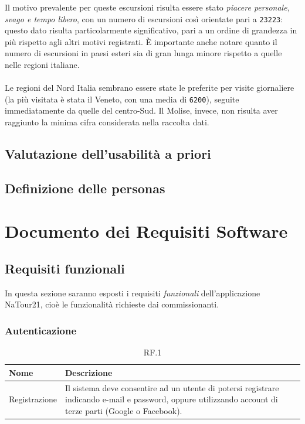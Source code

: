 \documentclass{natourDoc}
\begin{document}
Il motivo prevalente per queste escursioni risulta essere stato \textit{piacere personale, svago e tempo libero}, con un numero
di escursioni così orientate pari a \texttt{23223}: questo dato risulta particolarmente significativo, pari a un ordine
di grandezza in più rispetto agli altri motivi registrati. È importante anche notare quanto il numero di escursioni in paesi
esteri sia di gran lunga minore rispetto a quelle nelle regioni italiane.\\\\
Le regioni del Nord Italia sembrano essere state le preferite per visite giornaliere (la più visitata è stata il Veneto, con una media di
\texttt{6200}), seguite immediatamente da quelle del centro-Sud. Il Molise, invece, non risulta aver raggiunto
la minima cifra considerata nella raccolta dati.\\

\subsection{Valutazione dell'usabilità a priori}

\subsection{Definizione delle personas}

\section{Documento dei Requisiti Software}
\subsection{Requisiti funzionali}
In questa sezione saranno esposti i requisiti \textit{funzionali} dell'applicazione NaTour21, cioè le funzionalità richieste dai commissionanti.

\subsubsection{Autenticazione}
\begin{table}[H]
	\centering
	\begin{tabular}{ |p{5cm}|p{10.3cm}| }
		\hline
		\rowcolor{PineGreen!70}
		\textbf{Nome} & \textbf{Descrizione}                                                                                                                                      \\
		\hline
		Registrazione & Il sistema deve consentire ad un utente di potersi registrare indicando e-mail e password, oppure utilizzando account di terze parti (Google o Facebook). \\
		\hline
	\end{tabular}
	\caption{RF.1}
	\label{table:1}
\end{table}
\end{document}
